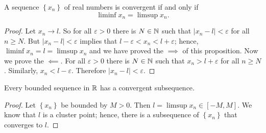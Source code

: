 \begin{proposition}[]
	A sequence $\left\{ x_n \right\}$ of real numbers
	is convergent if and only if \[
		\liminf x_n = \limsup x_n.
	\]
\end{proposition}

\begin{proof}
	Let $x_n \to l$.
	So for all $\varepsilon > 0$
	there is $N \in \mathbb{N}$
	such that $\left\lvert x_n - l \right\rvert < \varepsilon$
	for all $n \geq N$.
	But $\left\lvert x_n - l \right\rvert < \varepsilon$ implies that
	$l - \varepsilon < x_n < l + \varepsilon$;
	hence, $\liminf x_n = l = \limsup x_n$ and we have proved
	the $\implies$ of this proposition.
	Now we prove the $\impliedby$.
	For all $\varepsilon > 0$ there is $N \in \mathbb{N}$ such that
	$x_n > l + \varepsilon$ for all $n \geq N$.
	Similarly, $x_n < l - \varepsilon$.
	Therefore $\left\lvert x_n - l \right\rvert < \varepsilon$.
\end{proof}

\begin{theorem}
	Every bounded sequence in $\mathbb{R}$ has a convergent subsequence.
\end{theorem}

\begin{proof}
	Let $\left\{ x_n \right\}$ be bounded by $M > 0$.
	Then $l = \limsup x_n \in [-M,M]$.
	We know that $l$ is a cluster point; hence,
	there is a subsequence of $\left\{ x_n \right\}$ that converges to $l$.
\end{proof}
